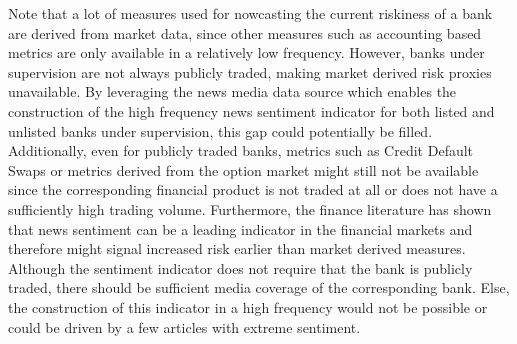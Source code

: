 
Note that a lot of measures used for nowcasting the current riskiness of a bank are derived from market data, since other measures such as accounting based metrics are only available in a relatively low frequency. However, banks under supervision are not always publicly traded, making market derived risk proxies unavailable. By leveraging the news media data source which enables the construction of the high frequency news sentiment indicator for both listed and unlisted banks under supervision, this gap could potentially be filled. Additionally, even for publicly traded banks, metrics such as Credit Default Swaps or metrics derived from the option market might still not be available since the corresponding financial product is not traded at all or does not have a sufficiently high trading volume. Furthermore, the finance literature has shown that news sentiment can be a leading indicator in the financial markets and therefore might signal increased risk earlier than market derived measures. Although the sentiment indicator does not require that the bank is publicly traded, there should be sufficient media coverage of the corresponding bank. Else, the construction of this indicator in a high frequency would not be possible or could be driven by a few articles with extreme sentiment.


\cleardoublepage
